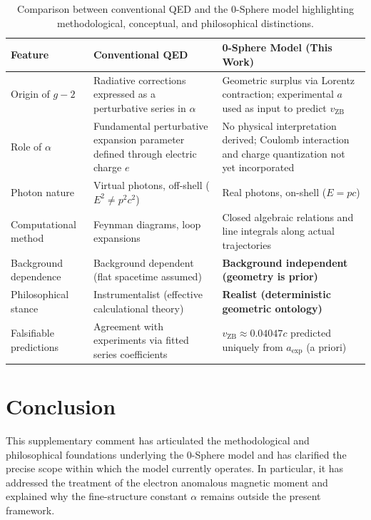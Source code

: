 \documentclass[12pt,letterpaper]{article}
\begin{document}
\begin{table}[h!]
\centering
\renewcommand{\arraystretch}{1.3}
\begin{tabularx}{\textwidth}{l X X}
\toprule
\textbf{Feature} & \textbf{Conventional QED} & \textbf{0-Sphere Model (This Work)} \\
\midrule
Origin of $g-2$ 
& Radiative corrections expressed as a perturbative series in $\alpha$ 
& Geometric surplus via Lorentz contraction; experimental $a$ used as input to predict $v_{\mathrm{ZB}}$ \\

Role of $\alpha$ 
& Fundamental perturbative expansion parameter defined through electric charge $e$ 
& No physical interpretation derived; Coulomb interaction and charge quantization not yet incorporated \\

Photon nature 
& Virtual photons, off-shell ($E^2 \neq p^2c^2$) 
& Real photons, on-shell ($E = pc$) \\

Computational method 
& Feynman diagrams, loop expansions 
& Closed algebraic relations and line integrals along actual trajectories \\

Background dependence 
& Background dependent (flat spacetime assumed) 
& \textbf{Background independent (geometry is prior)} \\

Philosophical stance 
& Instrumentalist (effective calculational theory) 
& \textbf{Realist (deterministic geometric ontology)} \\

Falsifiable predictions 
& Agreement with experiments via fitted series coefficients 
& $v_{\mathrm{ZB}} \approx 0.04047c$ predicted uniquely from $a_{\mathrm{exp}}$ (a priori) \\
\bottomrule
\end{tabularx}
\caption{Comparison between conventional QED and the 0-Sphere model highlighting methodological, conceptual, and philosophical distinctions.}
\label{tab:qed_comparison}
\end{table}



\section{Conclusion}

\justifying
This supplementary comment has articulated the methodological and philosophical foundations underlying the 0-Sphere model and has clarified the precise scope within which the model currently operates. In particular, it has addressed the treatment of the electron anomalous magnetic moment and explained why the fine-structure constant $\alpha$ remains outside the present framework.
\end{document}
